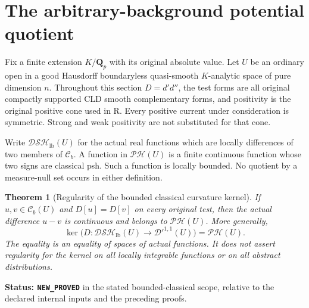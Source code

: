 \documentclass[11pt,a4paper]{article}
\numberwithin{equation}{section}
\newtheorem{theorem}{Theorem}[section]
\theoremstyle{definition}
\theoremstyle{remark}
\begin{document}
\section{The arbitrary-background potential quotient}
\label{sec:r5-arbitrary-background-quotient}

Fix a finite extension $K/\mathbf Q_p$ with its original absolute
value. Let $U$ be an ordinary open in a good Hausdorff boundaryless
quasi-smooth $K$-analytic space of pure dimension $n$.
Throughout this section $D=d'd''$, the test forms are all original
compactly supported CLD smooth complementary forms, and positivity
is the original positive cone used in R. Every positive current
under consideration is symmetric. Strong and weak positivity are
not substituted for that cone.

Write $\mathscr{DSH}_{\mathrm{lb}}(U)$ for the actual real functions
which are locally differences of two members of $\mathcal C_b$.
A function in $\mathscr{PH}(U)$ is a finite continuous function
whose two signs are classical psh. Such a function is locally
bounded. No quotient by a measure-null set occurs in either
definition.

\begin{theorem}[Regularity of the bounded classical curvature kernel]
\label{thm:r5-bounded-kernel-regularity}
If $u,v\in\mathcal C_b(U)$ and $D[u]=D[v]$ on every original
test, then the actual difference $u-v$ is continuous and belongs
to $\mathscr{PH}(U)$. More generally,
\[
 \ker\bigl(D:\mathscr{DSH}_{\mathrm{lb}}(U)
                   \longrightarrow\mathcal D'^{1,1}(U)\bigr)
                         =\mathscr{PH}(U).
\]
The equality is an equality of spaces of actual functions.
It does not assert regularity for the kernel on all locally
integrable functions or on all abstract distributions.
\end{theorem}

\noindent\textbf{Status: \texttt{NEW\_PROVED}} in the stated
bounded-classical scope, relative to the declared internal
inputs and the preceding proofs.
\end{document}
